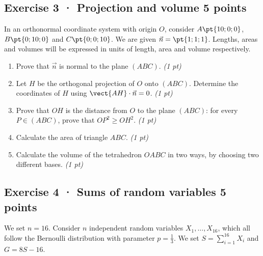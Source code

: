 \mxnewpage{}

\subsection*{Exercise 3 · Projection and volume \hfill 5 points}In an orthonormal coordinate system with origin $O$, consider $A\pt{10;0;0}$, $B\pt{0;10;0}$ and $C\pt{0;0;10}$. We are given $\vec n=\pt{1;1;1}$. Lengths, areas and volumes will be expressed in units of length, area and volume respectively.

\begin{enumerate}

\item Prove that $\vec n$ is normal to the plane $(ABC)$. \hfill\textit{(1 pt)}

\item Let $H$ be the orthogonal projection of $O$ onto $(ABC)$. Determine the coordinates of $H$ using $\vect{AH}\cdot\vec n=0$. \hfill\textit{(1 pt)}

\item Prove that $OH$ is the distance from $O$ to the plane $(ABC)$: for every $P\in(ABC)$, prove that $OP^2\ge OH^2$. \hfill\textit{(1 pt)}

\item Calculate the area of triangle $ABC$. \hfill\textit{(1 pt)}

\item Calculate the volume of the tetrahedron $OABC$ in two ways, by choosing two different bases. \hfill\textit{(1 pt)}

\end{enumerate}

\subsection*{Exercise 4 · Sums of random variables \hfill 5 points}We set $n=16$. Consider $n$ independent random variables $X_1,\ldots,X_{16}$, which all follow the Bernoulli distribution with parameter $p=\frac{1}{3}$. We set $S=\displaystyle\sum_{i=1}^{16}X_i$ and $G=8S-16$.

